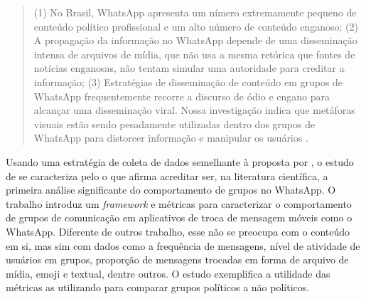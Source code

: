 \begin{quote}
    (1) No Brasil, WhatsApp apresenta um nímero extremamente pequeno de conteúdo político profissional e um alto número de conteúdo enganoso; (2) A propagação da informação no WhatsApp depende de uma disseminação intensa de arquivos de mídia, que não usa a mesma retórica que fontes de notícias enganosas, não tentam simular uma autoridade para creditar a informação; (3) Estratégias de disseminação de conteúdo em grupos de WhatsApp frequentemente recorre a discurso de ódio e engano para alcançar uma disseminação viral. Nossa investigação indica que metáforas visuais estão sendo pesadamente utilizadas dentro dos grupos de WhatsApp para distorcer informação e manipular os usuários  \cite[p.~1017, tradução nossa]{machado2019study}.
    
\end{quote}

Usando uma estratégia de coleta de dados semelhante à proposta por , o estudo de  se caracteriza pelo o que afirma acreditar ser, na literatura científica, a primeira análise significante do comportamento de grupos no WhatsApp. O trabalho introduz um \textit{framework} e métricas para caracterizar o comportamento de grupos de comunicação em aplicativos de troca de mensagem móveis como o WhatsApp. Diferente de outros trabalho, esse não se preocupa com o conteúdo em si, mas sim com dados como a frequência de mensagens, nível de atividade de usuários em grupos, proporção de mensagens trocadas em forma de arquivo de mídia, emoji e textual, dentre outros. O estudo exemplifica a utilidade das métricas as utilizando para comparar grupos políticos a não políticos.

